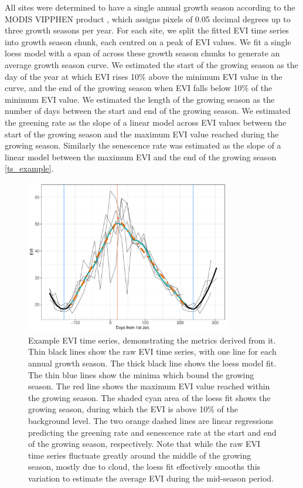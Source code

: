 \documentclass[11pt,a4paper]{article}
\begin{document}
All sites were determined to have a single annual growth season according to the MODIS VIPPHEN product \citep{}, which assigns pixels of 0.05 decimal degrees up to three growth seasons per year. For each site, we split the fitted EVI time series into growth season chunk, each centred on a peak of EVI values. We fit a single loess model with a span of \loessSpan{} across these growth season chunks to generate an average growth season curve. We estimated the start of the growing season as the day of the year at which EVI rises 10\% above the minimum EVI value in the curve, and the end of the growing season when EVI falls below 10\% of the minimum EVI value. We estimated the length of the growing season as the number of days between the start and end of the growing season. We estimated the greening rate as the slope of a linear model across EVI values between the start of the growing season and the maximum EVI value reached during the growing season. Similarly the senescence rate was estimated as the slope of a linear model between the maximum EVI and the end of the growing season \autoref{ts_example}.

\begin{figure}[H]
\centering
	\includegraphics[width=0.8\textwidth]{ts_example}
	\caption{Example EVI time series, demonstrating the metrics derived from it. Thin black lines show the raw EVI time series, with one line for each annual growth season. The thick black line shows the loess model fit. The thin blue lines show the minima which bound the growing season. The red line shows the maximum EVI value reached within the growing season. The shaded cyan area of the loess fit shows the growing season, during which the EVI is above 10\% of the background level. The two orange dashed lines are linear regressions predicting the greening rate and senescence rate at the start and end of the growing season, respectively. Note that while the raw EVI time series fluctuate greatly around the middle of the growing season, mostly due to cloud, the loess fit effectively smooths this variation to estimate the average EVI during the mid-season period.}
	\label{ts_example}
\end{figure}
\end{document}
